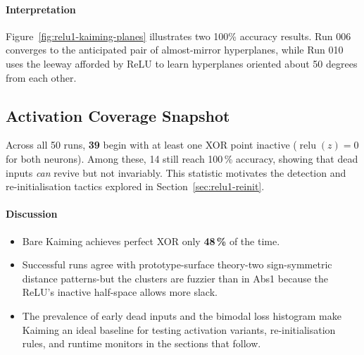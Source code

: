 \paragraph{Interpretation}
Figure~\ref{fig:relu1-kaiming-planes} illustrates two 100\% accuracy results. Run 006 converges to the anticipated pair of almost-mirror hyperplanes, while Run 010 uses the leeway afforded by ReLU to learn hyperplanes oriented about 50 degrees from each other.

\subsection*{Activation Coverage Snapshot}

Across all 50 runs, \textbf{39} begin with at least one XOR point inactive (\(\operatorname{relu}(z)=0\) for both neurons). 
Among these, 14 still reach 100\,\% accuracy, showing that dead inputs \emph{can} revive but not invariably.
This statistic motivates the detection and re-initialisation tactics explored in Section~\ref{sec:relu1-reinit}.

\paragraph{Discussion}
\begin{itemize}
  \item Bare Kaiming achieves perfect XOR only \textbf{48\,\%} of the time.
  \item Successful runs agree with prototype-surface theory-two sign-symmetric
        distance patterns-but the clusters are fuzzier than in Abs1 because
        the ReLU's inactive half-space allows more slack.
  \item The prevalence of early dead inputs and the bimodal loss histogram
        make Kaiming an ideal baseline for testing activation variants,
        re-initialisation rules, and runtime monitors in the sections that
        follow.
\end{itemize}

\hrulefill
